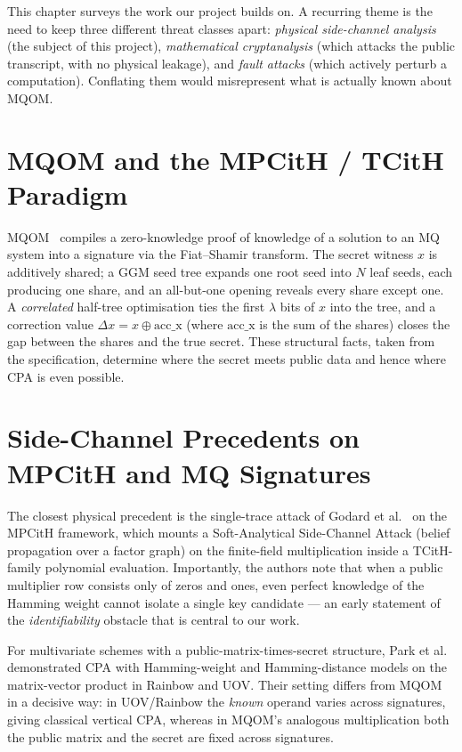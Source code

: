 This chapter surveys the work our project builds on. A recurring theme is the need to
keep three different threat classes apart: \emph{physical side-channel analysis} (the
subject of this project), \emph{mathematical cryptanalysis} (which attacks the public
transcript, with no physical leakage), and \emph{fault attacks} (which actively perturb
a computation). Conflating them would misrepresent what is actually known about MQOM.

\section{MQOM and the MPCitH / TCitH Paradigm}

MQOM~\cite{mqomspec} compiles a zero-knowledge proof of knowledge of a solution to an
MQ system into a signature via the Fiat--Shamir transform. The secret witness $x$ is
additively shared; a GGM seed tree expands one root seed into $N$ leaf seeds, each
producing one share, and an all-but-one opening reveals every share except one. A
\emph{correlated} half-tree optimisation ties the first $\lambda$ bits of $x$ into the
tree, and a correction value $\Delta x = x \oplus \mathrm{acc\_x}$ (where
$\mathrm{acc\_x}$ is the sum of the shares) closes the gap between the shares and the
true secret. These structural facts, taken from the specification, determine where the
secret meets public data and hence where CPA is even possible.

\section{Side-Channel Precedents on MPCitH and MQ Signatures}

The closest physical precedent is the single-trace attack of Godard et
al.~\cite{godard2024} on the MPCitH framework, which mounts a Soft-Analytical
Side-Channel Attack (belief propagation over a factor graph) on the finite-field
multiplication inside a TCitH-family polynomial evaluation. Importantly, the authors
note that when a public multiplier row consists only of zeros and ones, even perfect
knowledge of the Hamming weight cannot isolate a single key candidate --- an early
statement of the \emph{identifiability} obstacle that is central to our work.

For multivariate schemes with a public-matrix-times-secret structure, Park et
al.~\cite{park2018} demonstrated CPA with Hamming-weight and Hamming-distance models on
the matrix-vector product in Rainbow and UOV. Their setting differs from MQOM in a
decisive way: in UOV/Rainbow the \emph{known} operand varies across signatures, giving
classical vertical CPA, whereas in MQOM's analogous multiplication both the public
matrix and the secret are fixed across signatures.

